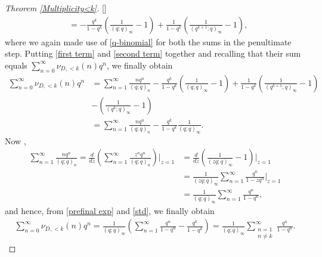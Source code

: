 \documentclass[12pt,reqno]{amsart}
\renewcommand{\(}{\left\(}
\renewcommand{\)}{\right\)}
\renewcommand{\[}{\left\[}
\renewcommand{\]}{\right\]}
\numberwithin{equation}{section}
\theoremstyle{plain}
\begin{document}
\begin{proof}[Theorem \textup{\ref{Multiplicity<k}}][]
\begin{align}
&= -\frac{q^k}{1-q^k}\left(\frac{1}{(q;q)_{\infty}}-1\right) + \frac{1}{1-q^k}\left(\frac{1}{(q^{k+1};q)_{\infty}}-1\right), \label{second term}
\end{align}
where we again made use of \eqref{q-binomial} for both the sums in the penultimate step.
Putting \eqref{first term} and \eqref{second term} together and recalling that their sum equals $\sum_{n=0}^{\infty}\nu_{D,<k}(n)q^n$, we finally obtain
\begin{align}
    \sum_{n=0}^{\infty}\nu_{D,<k}(n)q^n &=\sum_{n=1}^{\infty}\frac{nq^n}{(q;q)_n}-\frac{q^k}{1-q^k}\left(\frac{1}{(q;q)_{\infty}}-1\right)+\frac{1}{1-q^k}\left(\frac{1}{(q^{k+1};q)_{\infty}}-1\right) \nonumber\\
&-\left(\frac{1}{(q^{k};q)_{\infty}}-1\right) \nonumber \\
&=  \sum_{n=1}^{\infty}\frac{nq^n}{(q;q)_n}-\frac{q^k}{1-q^k}\frac{1}{(q;q)_{\infty}}. \label{prefinal exp}
\end{align}
Now ,
\begin{align}
\sum_{n=1}^{\infty}\frac{nq^n}{(q;q)_n}=\frac{d}{dz} \left(\sum_{n=1}^{\infty}\frac{z^n q^n}{(q;q)_{n}}\right) \Bigg|_{z=1}& = \frac{d}{dz}\left(\frac{1}{(zq;q)_{\infty}} - 1\right)\Bigg|_{z=1}\nonumber \\
& = \frac{1}{(zq;q)_{\infty}} \sum_{n=1}^{\infty}\frac{q^n}{1 - zq^n}\Bigg|_{z=1} \nonumber \\
&= \frac{1}{(q;q)_{\infty}} \sum_{n=1}^{\infty}\frac{q^n}{1 - q^n} \label{std},
\end{align}
and hence, from \eqref{prefinal exp} and \eqref{std}, we finally obtain
\begin{align*}
   \sum_{n=0}^{\infty}\nu_{D,<k}(n)q^n =  \frac{1}{(q;q)_{\infty}}\left( \sum_{n=1}^{\infty} \frac{q^n}{1 - q^n} - \frac{q^k}{1 - q^k}\right) = \frac{1}{(q;q)_{\infty}}\sum_{\substack{n=1\\ n \neq k}}^{\infty}\frac{q^n}{1-q^n}.
\end{align*}

\end{proof}
\end{document}
